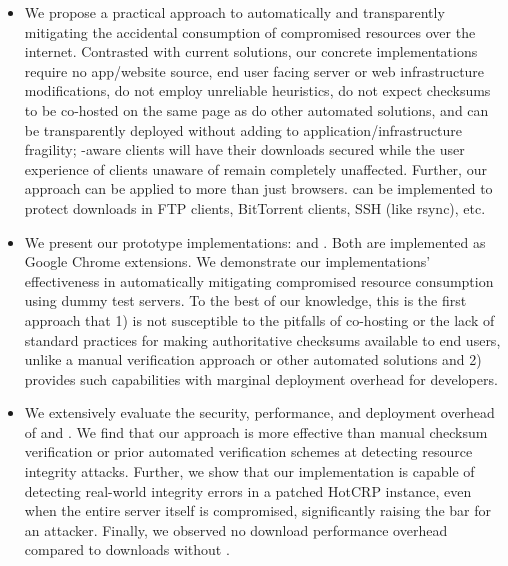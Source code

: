 \begin{itemize}

  \item We propose a practical approach to automatically and transparently
  mitigating the accidental consumption of compromised resources over the
  internet. Contrasted with current solutions, our concrete implementations
  require no app/website source, end user facing server or web infrastructure
  modifications, do not employ unreliable heuristics, do not expect checksums to
  be co-hosted on the same page as do other automated solutions, and can be
  transparently deployed without adding to application/infrastructure fragility;
  \eg \SYSTEM{}-aware clients will have their downloads secured while the user
  experience of clients unaware of \SYSTEM{} remain completely unaffected.
  Further, our approach can be applied to more than just browsers. \SYSTEM{} can
  be implemented to protect downloads in FTP clients, BitTorrent clients, SSH
  (like rsync), etc.

  \item We present our prototype \SYSTEM{} implementations: \DNSSYS{} and
  \DHTSYS{}. Both are implemented as Google Chrome extensions. We demonstrate
  our implementations' effectiveness in automatically mitigating compromised
  resource consumption using dummy test servers. To the best of our knowledge,
  this is the first approach that 1) is not susceptible to the pitfalls of
  co-hosting or the lack of standard practices for making authoritative
  checksums available to end users, unlike a manual verification approach or
  other automated solutions and 2) provides such capabilities with marginal
  deployment overhead for developers.

  \item We extensively evaluate the security, performance, and deployment
  overhead of \DNSSYS{} and \DHTSYS{}. We find that our approach is more
  effective than manual checksum verification or prior automated verification
  schemes at detecting resource integrity attacks. Further, we show that our
  \DNSSYS{} implementation is capable of detecting real-world integrity errors
  in a patched HotCRP instance, even when the entire server itself is
  compromised, significantly raising the bar for an attacker. Finally, we
  observed no download performance overhead compared to downloads without
  \DNSSYS{}.

\end{itemize}

